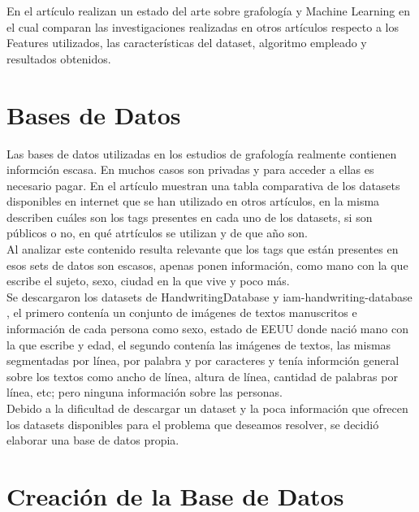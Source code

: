 \documentclass[10pt, a4paper]{article}
\begin{document}
        En el art\'iculo \cite{remaida2020handwriting} realizan un estado del arte sobre grafolog\'ia y Machine Learning en el cual comparan las investigaciones realizadas en 
        otros art\'iculos respecto a los Features utilizados, las caracter\'isticas del dataset, algoritmo empleado y resultados obtenidos.

    \section{Bases de Datos}

        Las bases de datos utilizadas en los estudios de grafolog\'ia realmente contienen informci\'on escasa. En muchos casos 
        son privadas y para acceder a ellas es necesario pagar. En el art\'iculo \cite{likforman2017emothaw} muestran una tabla comparativa de los datasets disponibles en 
        internet que se han utilizado en otros art\'iculos, en la misma describen cu\'ales son los tags presentes en cada uno de los datasets, si son p\'ublicos o no, en qu\'e atrt\'iculos se utilizan y 
        de que a\~no son. \\ 

        Al analizar este contenido resulta relevante que los tags que est\'an presentes en esos sets de datos son escasos, apenas ponen informaci\'on, como mano con la que escribe el sujeto, sexo, 
        ciudad en la que vive y poco m\'as. \\ 

        Se descargaron los datasets de HandwritingDatabase \cite{DataSet1} y iam-handwriting-database \cite{DataSet2}, el primero conten\'ia un conjunto de im\'agenes de textos manuscritos e informaci\'on de cada persona como sexo, estado de EEUU donde naci\'o 
        mano con la que escribe y edad, el segundo conten\'ia las im\'agenes de textos, las mismas segmentadas por l\'inea, por palabra y por caracteres y ten\'ia informci\'on general sobre los textos como 
        ancho de l\'inea, altura de l\'inea, cantidad de palabras por l\'inea, etc; pero ninguna informaci\'on sobre las personas. \\ 

        Debido a la dificultad de descargar un dataset y la poca informaci\'on que ofrecen los datasets disponibles para el problema que deseamos resolver, se decidi\'o elaborar una base de datos propia.

    \section{Creaci\'on de la Base de Datos}
\end{document}
